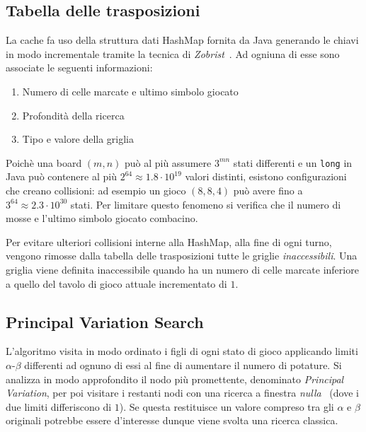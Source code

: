 \documentclass{article}
\begin{document}
\subsection*{Tabella delle trasposizioni}

La cache fa uso della struttura dati HashMap fornita da Java generando le chiavi 
in modo incrementale tramite la tecnica di \emph{Zobrist}~\cite{zobrist}. 
Ad ogniuna di esse sono associate le seguenti informazioni:
\begin{enumerate}
  \item Numero di celle marcate e ultimo simbolo giocato
  \item Profondit\`a della ricerca
  \item Tipo e valore della griglia
\end{enumerate}
Poich\`e una board $(m,n)$ pu\`o al pi\`u assumere $3^{mn}$ stati differenti e
un \verb!long! in Java pu\`o contenere al pi\`u $2^{64} \approx 1.8 \cdot 10^{19}$ valori distinti,
esistono configurazioni che creano collisioni: ad esempio un gioco $(8, 8, 4)$
pu\`o avere fino a $3^{64} \approx 2.3 \cdot 10^{30}$ stati. Per limitare questo
fenomeno si verifica che il numero di mosse e l'ultimo simbolo giocato combacino. %

Per evitare ulteriori collisioni interne alla HashMap, alla fine di
ogni turno, vengono rimosse dalla tabella delle trasposizioni tutte le griglie \emph{
inaccessibili}. Una griglia viene definita inaccessibile quando ha un numero di
celle marcate inferiore a quello del tavolo di gioco attuale incrementato di $1$.

\subsection*{Principal Variation Search}

L'algoritmo visita in modo ordinato i figli di ogni stato di gioco applicando
limiti $\alpha$-$\beta$ differenti ad ognuno di essi al fine di aumentare il numero di potature.
Si analizza in modo approfondito il nodo pi\`u promettente, denominato \emph{Principal
Variation}, per poi visitare i restanti nodi con una ricerca a finestra \emph{nulla}~\cite{scout}
(dove i due limiti differiscono di $1$). Se questa restituisce un valore compreso
tra gli $\alpha$ e $\beta$ originali potrebbe essere d'interesse dunque viene
svolta una ricerca classica.
\end{document}
